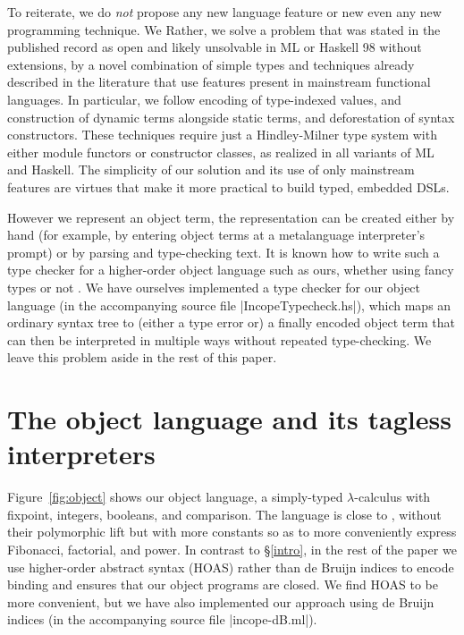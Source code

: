 To reiterate, we do \emph{not} propose any new language
feature or \ifshort new \else even any new programming \fi technique.
\ifshort
We
\else
Rather, we
\fi
solve a problem that was stated in the published record as open and
likely unsolvable in ML or Haskell 98 without extensions, by a novel
combination of simple types and techniques already described in the
literature that use features present in mainstream functional languages.
In particular, we follow  encoding of type-indexed
values,  and 
construction of dynamic terms alongside static terms, and
 deforestation of syntax
constructors.  These techniques require just
a Hindley-Milner type system with either module
functors or constructor classes, as realized in all variants of ML and
Haskell.
The simplicity of our solution and its
use of only mainstream features \ifshort\else are virtues that \fi make it more practical to build typed,
embedded DSLs.

\ifshort\else
However we represent an object term,
the representation can be created either by hand (for example, by
entering object terms at a metalanguage interpreter's prompt) or
by parsing and type-checking text.
It is known how to write such a type checker
for a higher-order object language such as ours,
whether using fancy types \citep{Guillemette-Monier-PLPV,WalidICFP02} or not \citep{baars-typing}.
We have ourselves implemented a type checker for our object
language (in the accompanying source file |IncopeTypecheck.hs|),
which maps an ordinary syntax tree to (either a type error or) a finally
encoded object term that can then be interpreted in multiple ways
without repeated type-checking.  We leave this problem aside in the
rest of this paper.
\fi

\section{The object language and its tagless interpreters}\label{language}

Figure~\ref{fig:object} shows our object language, a simply-typed
$\lambda$-calculus with fixpoint, integers, booleans, and comparison.
The language is close to , without their polymorphic
lift but with more constants so as to more conveniently express Fibonacci,
factorial, and power.
In contrast to \S\ref{intro}, in the rest of the paper 
we use higher-order
abstract syntax (HOAS) \citep{miller-manipulating,pfenning-higher-order}
rather than de Bruijn indices to encode binding and
ensures that our object programs are closed.
We find HOAS to be more convenient, but we have also implemented our
approach using de Bruijn indices (in the accompanying source file
|incope-dB.ml|).


